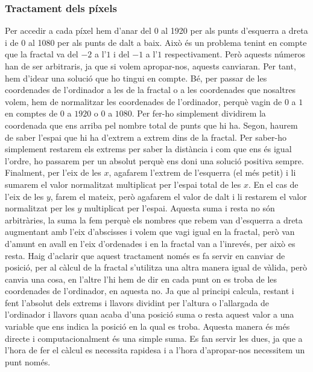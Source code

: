 \subsubsection{Tractament dels píxels}
Per accedir a cada píxel hem d'anar del 0 al 1920 per als punts d'esquerra a dreta i de 0 al 1080 per als punts de dalt a baix. Això és un problema tenint en compte que la fractal va del $-2$ a l'$1$ i del $-1$ a l'$1$ respectivament. Però aquests números han de ser arbitraris, ja que si volem apropar-nos, aquests canviaran. Per tant, hem d'idear una solució que ho tingui en compte.\n
Bé, per passar de les coordenades de l'ordinador a les de la fractal o a les coordenades que nosaltres volem, hem de normalitzar les coordenades de l'ordinador, perquè vagin de $0$ a $1$ en comptes de $0$ a $1920$ o $0$ a $1080$. Per fer-ho simplement dividirem la coordenada que ens arriba pel nombre total de punts que hi ha. \n
Segon, haurem de saber l'espai que hi ha d'extrem a extrem dins de la fractal. Per saber-ho simplement restarem els extrems per saber la distància i com que ens és igual l'ordre, ho passarem per un absolut perquè ens doni una solució positiva sempre. \n
Finalment, per l'eix de les $x$, agafarem l'extrem de l'esquerra (el més petit) i li sumarem el valor normalitzat multiplicat per l'espai total de les $x$. En el cas de l'eix de les $y$, farem el mateix, però agafarem el valor de dalt i li restarem el valor normalitzat per les $y$ multiplicat per l'espai. \n
Aquesta suma i resta no són arbitràries, la suma la fem perquè els nombres que rebem van d'esquerra a dreta augmentant amb l'eix d'abscisses i volem que vagi igual en la fractal, però van d'amunt en avall en l'eix d'ordenades i en la fractal van a l'inrevés, per això es resta. \n
Haig d'aclarir que aquest tractament només es fa servir en canviar de posició, per al càlcul de la fractal s'utilitza una altra manera igual de vàlida, però canvia una cosa, en l'altre l'hi hem de dir en cada punt on es troba de les coordenades de l'ordinador, en aquesta no. Ja que al principi calcula, restant i fent l'absolut dels extrems i llavors dividint per l'altura o l'allargada de l'ordinador i llavors quan acaba d'una posició suma o resta aquest valor a una variable que ens indica la posició en la qual es troba. Aquesta manera és més directe i computacionalment és una simple suma. \n
Es fan servir les dues, ja que a l'hora de fer el càlcul es necessita rapidesa i a l'hora d'apropar-nos necessitem un punt només.

